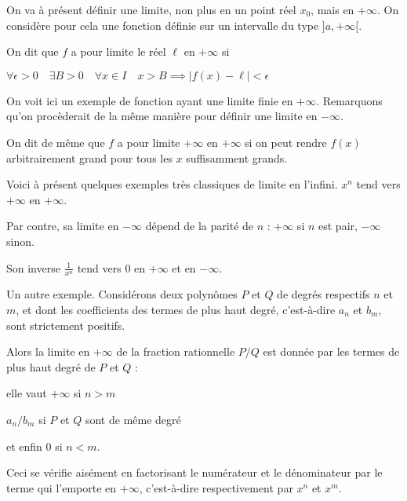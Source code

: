 \diapo

On va à présent définir une limite, non plus en un point réel $x_0$, mais en $+\infty$. On considère pour cela une fonction définie sur un intervalle du type $]a,+\infty[$.

\change
On dit que $f$ a pour limite le réel $\ell$ en $+\infty$ si 

$
\forall \epsilon>0 \quad \exists B>0 \quad \forall x\in I \quad x>B \implies \vert f(x)-\ell\vert <\epsilon
$

On voit ici un exemple de fonction ayant une limite finie en $+\infty$. Remarquons qu'on procèderait de la même manière pour définir une limite en $-\infty$.

\diapo

On dit de même que $f$ a pour limite $+\infty$ en $+\infty$ si on peut rendre $f(x)$ arbitrairement grand pour tous les $x$ suffisamment grands.

\change
Voici à présent quelques exemples très classiques de limite en l'infini. $x^n$ tend vers $+\infty$ en $+\infty$. 

\change
Par contre, sa limite en $-\infty$ dépend de la parité de $n$ :
$+\infty$ si $n$ est pair, $-\infty$ sinon.

\change
Son inverse $\frac{1}{x^n}$ tend vers $0$ en $+\infty$ et en $-\infty$.


\diapo

Un autre exemple. Considérons deux polynômes $P$ et $Q$ de degrés respectifs $n$ et $m$, et dont les coefficients des termes de plus haut degré, c'est-à-dire $a_n$ et $b_m$, sont strictement positifs.

\change
Alors la limite en $+\infty$ de la fraction rationnelle $P/Q$ est donnée par les termes de plus haut degré de $P$ et $Q$ :

\change
elle vaut $+\infty$ si $n>m$

\change
$a_n/b_m$ si $P$ et $Q$ sont de même degré

\change
et enfin $0$ si $n<m$.

\change
Ceci se vérifie aisément en factorisant le numérateur et le 
dénominateur par le terme qui l'emporte en $+\infty$, 
c'est-à-dire respectivement par $x^n$ et $x^m$.


\diapo

